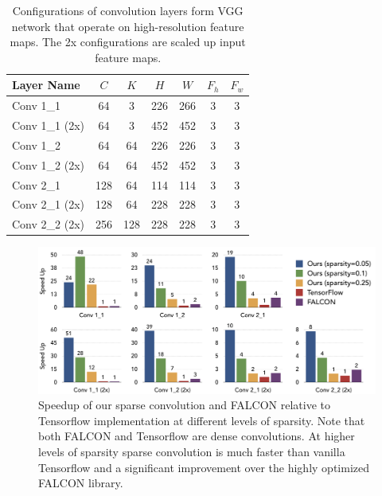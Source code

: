 \documentclass{article}
\begin{document}
\begin{table}[t]\centering
\small
\begin{tabularx}{0.75\textwidth}{Xcccccc}\toprule
    Layer Name & $C$ & $K$ & $H$ & $W$ & $F_h$ & $F_w$\\ \midrule 
    Conv 1\_1 & 64 & 3 & 226 & 266 & 3  & 3 \\
    Conv 1\_1 (2x) & 64 & 3 & 452 & 452 & 3  & 3 \\
    Conv 1\_2  & 64 & 64 & 226 & 226 & 3  & 3 \\
    Conv 1\_2 (2x) & 64 & 64 & 452 & 452 & 3  & 3 \\
    Conv 2\_1  & 128 & 64 & 114 & 114 & 3  & 3 \\
    Conv 2\_1 (2x) & 128 & 64 & 228 & 228 & 3  & 3 \\
    Conv 2\_2 (2x) & 256 & 128 & 228 & 228 & 3  & 3 \\
    \bottomrule
\end{tabularx}
    \vspace{1em}
    \caption{Configurations of convolution layers form VGG network that operate
    on high-resolution feature maps. The 2x configurations are scaled up input
    feature maps.}
\label{tab:conv_config}
\end{table}


\begin{figure}[t]
	\centering
	\includegraphics[width=\textwidth]{falcon_tf}
    \caption{Speedup of our sparse convolution and FALCON relative to
    Tensorflow implementation at different levels of sparsity. Note that both
    FALCON and Tensorflow are dense convolutions. At higher levels of sparsity
    sparse convolution is much faster than vanilla Tensorflow and a significant
    improvement over the highly optimized FALCON library.}
\label{fig:falcon_tf}
\end{figure}
\end{document}
